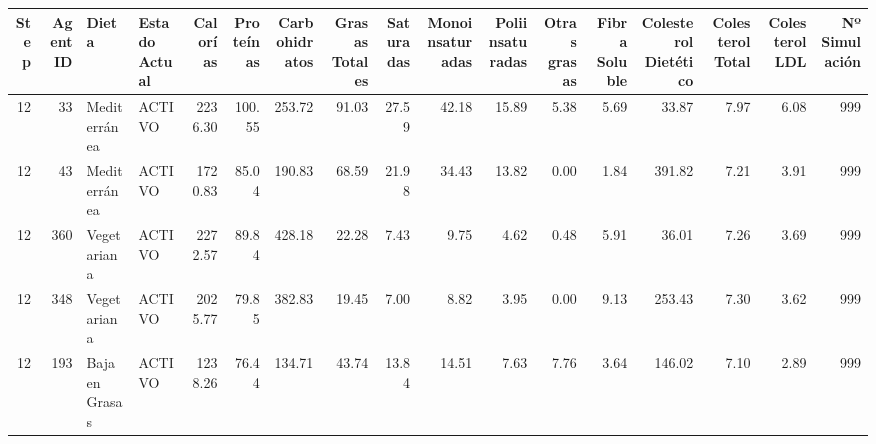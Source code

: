 \begin{tabular}{rrllrrrrrrrrrrrrr}
\toprule
Step & AgentID & Dieta & Estado Actual & Calorías & Proteínas & Carbohidratos & Grasas Totales & Saturadas & Monoinsaturadas & Poliinsaturadas & Otras grasas & Fibra Soluble & Colesterol Dietético & Colesterol Total & Colesterol LDL & Nº Simulación \\
\midrule
12 & 33 & Mediterránea & ACTIVO & 2236.30 & 100.55 & 253.72 & 91.03 & 27.59 & 42.18 & 15.89 & 5.38 & 5.69 & 33.87 & 7.97 & 6.08 & 999 \\
12 & 43 & Mediterránea & ACTIVO & 1720.83 & 85.04 & 190.83 & 68.59 & 21.98 & 34.43 & 13.82 & 0.00 & 1.84 & 391.82 & 7.21 & 3.91 & 999 \\
12 & 360 & Vegetariana & ACTIVO & 2272.57 & 89.84 & 428.18 & 22.28 & 7.43 & 9.75 & 4.62 & 0.48 & 5.91 & 36.01 & 7.26 & 3.69 & 999 \\
12 & 348 & Vegetariana & ACTIVO & 2025.77 & 79.85 & 382.83 & 19.45 & 7.00 & 8.82 & 3.95 & 0.00 & 9.13 & 253.43 & 7.30 & 3.62 & 999 \\
12 & 193 & Baja en Grasas & ACTIVO & 1238.26 & 76.44 & 134.71 & 43.74 & 13.84 & 14.51 & 7.63 & 7.76 & 3.64 & 146.02 & 7.10 & 2.89 & 999 \\
\bottomrule
\end{tabular}
